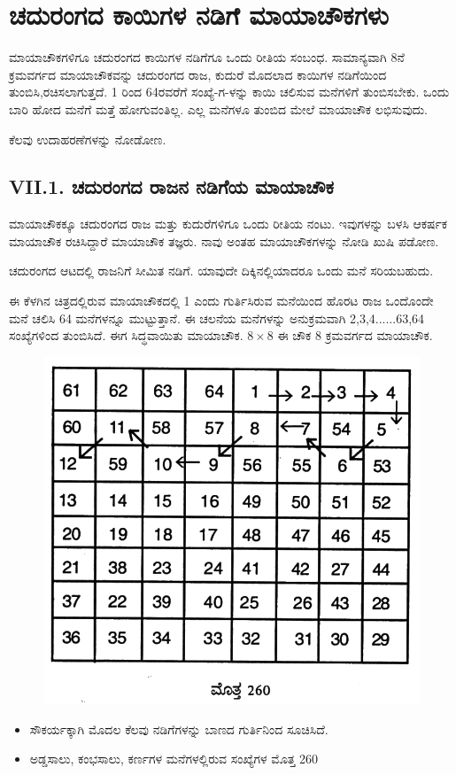 \chapter{ಚದುರಂಗದ ಕಾಯಿಗಳ ನಡಿಗೆ ಮಾಯಾಚೌಕಗಳು}

ಮಾಯಾಚೌಕಗಳಿಗೂ ಚದುರಂಗದ ಕಾಯಿಗಳ ನಡಿಗೆಗೂ ಒಂದು ರೀತಿಯ ಸಂಬಂಧ. ಸಾಮಾನ್ಯವಾಗಿ 8ನೆ ಕ್ರಮವರ್ಗದ ಮಾಯಾಚೌಕವನ್ನು ಚದುರಂಗದ ರಾಜ, ಕುದುರೆ ಮೊದಲಾದ ಕಾಯಿಗಳ ನಡಿಗೆಯಿಂದ ತುಂಬಿಸಿ,ರಚಿಸಲಾಗುತ್ತದೆ. 1 ರಿಂದ 64ರವರೆಗೆ ಸಂಖ್ಯೆ-ಗ-ಳನ್ನು ಕಾಯಿ ಚಲಿಸುವ ಮನೆಗಳಿಗೆ ತುಂಬಿಸಬೇಕು. ಒಂದು ಬಾರಿ ಹೋದ ಮನೆಗೆ ಮತ್ತೆ ಹೋಗುವಂತಿಲ್ಲ. ಎಲ್ಲ ಮನೆಗಳೂ ತುಂಬಿದ ಮೇಲೆ ಮಾಯಾಚೌಕ ಲಭಿಸುವುದು.

ಕೆಲವು ಉದಾಹರಣೆಗಳನ್ನು ನೋಡೋಣ.

\section*{VII.1. ಚದುರಂಗದ ರಾಜನ ನಡಿಗೆಯ ಮಾಯಾಚೌಕ}

ಮಾಯಾಚೌಕಕ್ಕೂ ಚದುರಂಗದ ರಾಜ ಮತ್ತು ಕುದುರೆಗಳಿಗೂ ಒಂದು ರೀತಿಯ ನಂಟು. ಇವುಗಳನ್ನು ಬಳಸಿ ಆಕರ್ಷಕ ಮಾಯಾಚೌಕ ರಚಿಸಿದ್ದಾರೆ ಮಾಯಾಚೌಕ ತಜ್ಞರು. ನಾವು ಅಂತಹ ಮಾಯಾಚೌಕಗಳನ್ನು ನೋಡಿ ಖುಷಿ ಪಡೋಣ.

ಚದುರಂಗದ ಆಟದಲ್ಲಿ ರಾಜನಿಗೆ ಸೀಮಿತ ನಡಿಗೆ. ಯಾವುದೇ ದಿಕ್ಕಿನಲ್ಲಿಯಾದರೂ ಒಂದು ಮನೆ ಸರಿಯಬಹುದು.

ಈ ಕೆಳಗಿನ ಚಿತ್ರದಲ್ಲಿರುವ ಮಾಯಾಚೌಕದಲ್ಲಿ 1 ಎಂದು ಗುರ್ತಿಸಿರುವ ಮನೆಯಿಂದ ಹೊರಟ ರಾಜ ಒಂದೊಂದೇ ಮನೆ ಚಲಿಸಿ 64 ಮನೆಗಳನ್ನೂ ಮುಟ್ಟುತ್ತಾನೆ. ಈ ಚಲನೆಯ ಮನೆಗಳನ್ನು ಅನುಕ್ರಮವಾಗಿ 2,3,4......63,64 ಸಂಖ್ಯೆಗಳಿಂದ ತುಂಬಿಸಿದೆ. ಈಗ ಸಿದ್ಧವಾಯಿತು ಮಾಯಾಚೌಕ. $8 \times 8$ ಈ ಚೌಕ 8 ಕ್ರಮವರ್ಗದ ಮಾಯಾಚೌಕ.
\begin{figure}[H]
\includegraphics{src/figures/chap6/fig6.1.jpg}
\end{figure}
\begin{itemize}
	\item ಸೌಕರ್ಯಕ್ಕಾಗಿ ಮೊದಲ ಕೆಲವು ನಡಿಗೆಗಳನ್ನು ಬಾಣದ ಗುರ್ತಿನಿಂದ ಸೂಚಿಸಿದೆ.
	\item ಅಡ್ಡಸಾಲು, ಕಂಭಸಾಲು, ಕರ್ಣಗಳ ಮನೆಗಳಲ್ಲಿರುವ ಸಂಖ್ಯೆಗಳ ಮೊತ್ತ 260
\end{itemize}

